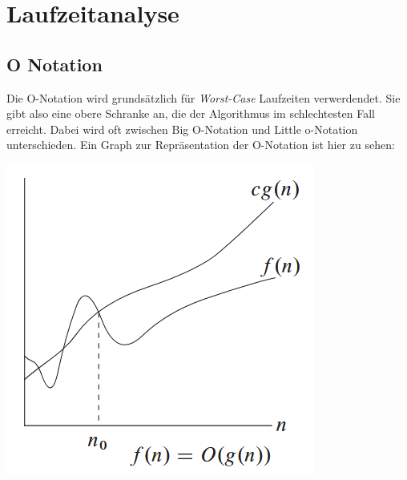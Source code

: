 \documentclass[ngerman,
color=3b,
load_common, %
boxarc,
main,
tikz,
border=3mm
]{article}
\begin{document}
\newpage
\section{Laufzeitanalyse}
\subsection{O Notation}
Die O-Notation wird grundsätzlich für \textit{Worst-Case} Laufzeiten verwerdendet. Sie gibt also eine obere Schranke an, die der Algorithmus im schlechtesten Fall erreicht. Dabei wird oft zwischen Big O-Notation und Little o-Notation unterschieden. 
Ein Graph zur Repräsentation der O-Notation ist hier zu sehen:
\begin{center}
    \includegraphics[scale=0.6]{Pics/ONotation.png}
\end{center}
\end{document}
